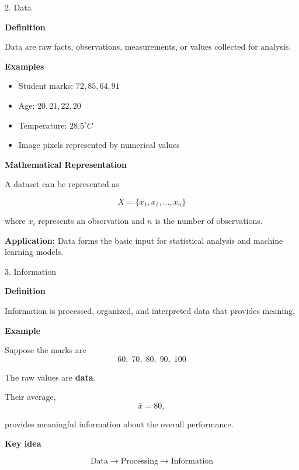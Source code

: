 \begin{frame}{2. Data}

\textbf{Definition}

Data are raw facts, observations, measurements, or values collected
for analysis.

\textbf{Examples}

\begin{itemize}
    \item Student marks: $72, 85, 64, 91$
    \item Age: $20, 21, 22, 20$
    \item Temperature: $28.5^\circ C$
    \item Image pixels represented by numerical values
\end{itemize}

\textbf{Mathematical Representation}

A dataset can be represented as

\[
X = \{x_1,x_2,\ldots,x_n\}
\]

where $x_i$ represents an observation and $n$ is the number of
observations.

\textbf{Application:} Data forms the basic input for statistical
analysis and machine learning models.

\end{frame}



\begin{frame}{3. Information}

\textbf{Definition}

Information is processed, organized, and interpreted data that
provides meaning.

\textbf{Example}

Suppose the marks are \[
60,\;70,\;80,\;90,\;100
\]

The raw values are \textbf{data}.

Their average, \[
\bar{x} = 80,
\]

provides meaningful information about the overall performance.

\textbf{Key idea}

\[
\boxed{\text{Data} \longrightarrow \text{Processing} 
\longrightarrow \text{Information}}
\]

\end{frame}



